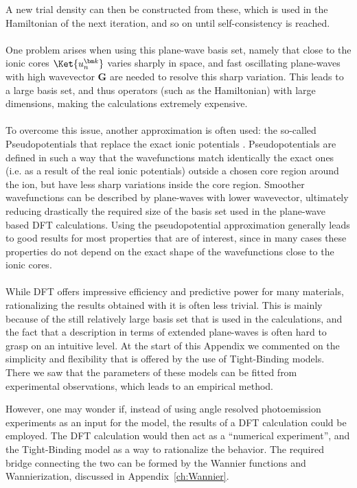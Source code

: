A new trial density can then be constructed from these, which is used in the Hamiltonian of the next iteration, and so on until self-consistency is reached.
\\\\
One problem arises when using this plane-wave basis set, namely that close to the ionic cores $\Ket{u_n^{\bm k}}$ varies sharply in space, and fast oscillating plane-waves with high wavevector $\bm G$ are needed to resolve this sharp variation.
This leads to a large basis set, and thus operators (such as the Hamiltonian) with large dimensions, making the calculations extremely expensive.
\\\\
To overcome this issue, another approximation is often used: the so-called Pseudopotentials that replace the exact ionic potentials \cite{Hamann1979,Louie1982,Vanderbilt1990,Joubert1999}.
Pseudopotentials are defined in such a way that the wavefunctions match identically the exact ones (i.e. as a result of the real ionic potentials) outside a chosen core region around the ion, but have less sharp variations inside the core region.
Smoother wavefunctions can be described by plane-waves with lower wavevector, ultimately reducing drastically the required size of the basis set used in the plane-wave based DFT calculations.
Using the pseudopotential approximation generally leads to good results for most properties that are of interest, since in many cases these properties do not depend on the exact shape of the wavefunctions close to the ionic cores.
\\\\
While DFT offers impressive efficiency and predictive power for many materials, rationalizing the results obtained with it is often less trivial.
This is mainly because of the still relatively large basis set that is used in the calculations, and the fact that a description in terms of extended plane-waves is often hard to grasp on an intuitive level.
At the start of this Appendix we commented on the simplicity and flexibility that is offered by the use of Tight-Binding models.
There we saw that the parameters of these models can be fitted from experimental observations, which leads to an empirical method.

However, one may wonder if, instead of using angle resolved photoemission experiments as an input for the model, the results of a DFT calculation could be employed.
The DFT calculation would then act as a ``numerical experiment'', and the Tight-Binding model as a way to rationalize the behavior.
The required bridge connecting the two can be formed by the Wannier functions and Wannierization, discussed in Appendix~\ref{ch:Wannier}. 
